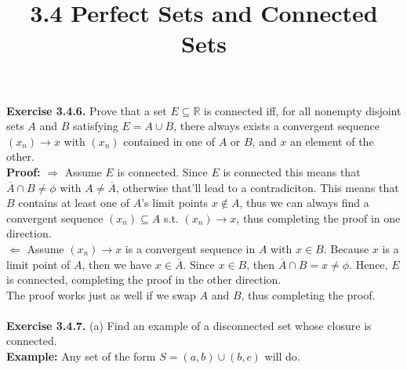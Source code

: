 \documentclass{article}
\title{\textbf{3.4 Perfect Sets and Connected Sets}}
\begin{document}
\maketitle
\textbf{Exercise 3.4.6.} Prove that a set $E \subseteq \mathbb{R}$ is connected iff, for all nonempty disjoint sets $A$ and $B$ satisfying $E = A \cup B$, there always exists a convergent sequence $(x_n) \to x$ with $(x_n)$ contained in one of $A$ or $B$, and $x$ an element of the other. \\
\textbf{Proof:} $\Rightarrow$ Assume $E$ is connected. Since $E$ is connected this means that $\overline{A} \cap B \neq \phi$ with $A \neq \overline{A}$, otherwise that'll lead to a contradiciton. This means that $B$ contains at least one of $A$'s limit points $x \not\in A$, thus we can always find a convergent sequence $(x_n) \subseteq A$ s.t. $(x_n) \to x$, thus completing the proof in one direction. \\
$\Leftarrow$ Assume $(x_n) \to x$ is a convergent sequence in $A$ with $x \in B$. Because $x$ is a limit point of $A$, then we have $x \in \overline{A}$. Since $x \in B$, then $\overline{A} \cap B = x \neq \phi$. Hence, $E$ is connected, completing the proof in the other direction. \\ 
The proof works just as well if we swap $A$ and $B$, thus completing the proof. \\ \\
\textbf{Exercise 3.4.7.} (a) Find an example of a disconnected set whose closure is connected. \\ 
\textbf{Example:} Any set of the form $S = (a, b) \cup (b, c)$ will do. 
\end{document}
